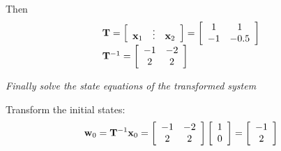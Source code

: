 Then
\[
\begin{array}{l}
 {\bf{T}} = \left[ {\begin{array}{*{20}c}
   {{\bf{x}}_1 } &  \vdots  & {{\bf{x}}_2 }  \\
\end{array}} \right] = \left[ {\begin{array}{*{20}c}
   1 & 1  \\
   { - 1} & { - 0.5}  \\
\end{array}} \right] \\
 {\bf{T}}^{ - 1}  = \left[ {\begin{array}{*{20}c}
   { - 1} & { - 2}  \\
   2 & 2  \\
\end{array}} \right] \\
 \end{array}
\]



\emph{Finally solve the state equations of the transformed system}

Transform the initial states:
\[
{\bf{w}}_0  = {\bf{T}}^{ - 1} {\bf{x}}_0  = \left[ {\begin{array}{*{20}c}
   { - 1} & { - 2}  \\
   2 & 2  \\
\end{array}} \right]\left[ {\begin{array}{*{20}c}
   1  \\
   0  \\
\end{array}} \right] = \left[ {\begin{array}{*{20}c}
   { - 1}  \\
   2  \\
\end{array}} \right]
\]



